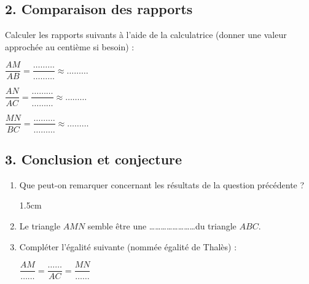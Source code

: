 \documentclass[a4paper]{book}
\begin{document}
\subsection*{2. Comparaison des rapports}

    Calculer les rapports suivants à l'aide de la calculatrice (donner une valeur approchée au centième si besoin) :
    
    \medskip
    \begin{minipage}[t]{0.33\textwidth}
        \centering $\dfrac{AM}{AB} = \dfrac{\dots\dots\dots}{\dots\dots\dots} \approx \dots\dots\dots$
    \end{minipage}
    \begin{minipage}[t]{0.33\textwidth}
        \centering $\dfrac{AN}{AC} = \dfrac{\dots\dots\dots}{\dots\dots\dots} \approx \dots\dots\dots$
    \end{minipage}
    \begin{minipage}[t]{0.33\textwidth}
        \centering $\dfrac{MN}{BC} = \dfrac{\dots\dots\dots}{\dots\dots\dots} \approx \dots\dots\dots$
    \end{minipage}

\subsection*{3. Conclusion et conjecture}

    \begin{enumerate}
        \item Que peut-on remarquer concernant les résultats de la question précédente ?
        \begin{ZoneReponse}{1.5cm}
        \end{ZoneReponse}
        
        \item Le triangle $AMN$ semble être une \dots\dots\dots\dots\dots\dots\dots\dots du triangle $ABC$.
        \item Compléter l'égalité suivante (nommée égalité de Thalès) :
        \vspace{0.5cm}
        \begin{center}
            {\Large $\dfrac{AM}{\dots\dots} = \dfrac{\dots\dots}{AC} = \dfrac{MN}{\dots\dots}$}
        \end{center}
    \end{enumerate}
\end{document}

